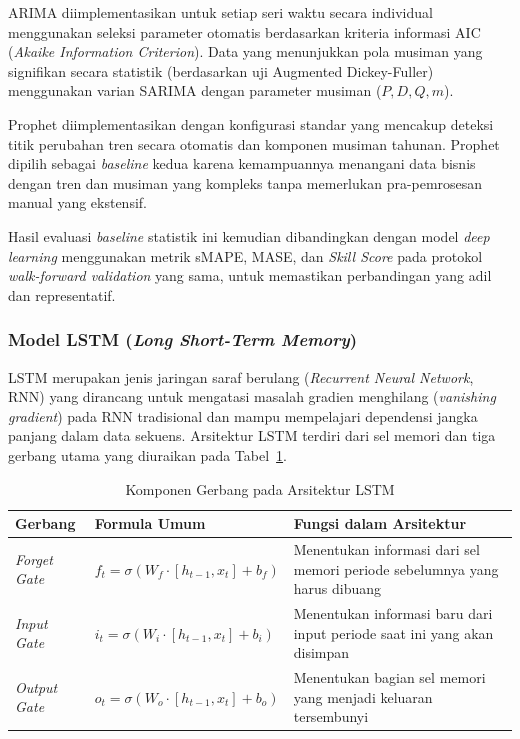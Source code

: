 ARIMA diimplementasikan untuk setiap seri waktu secara individual menggunakan seleksi parameter otomatis berdasarkan kriteria informasi AIC (\textit{Akaike Information Criterion}). Data yang menunjukkan pola musiman yang signifikan secara statistik (berdasarkan uji Augmented Dickey-Fuller) menggunakan varian SARIMA dengan parameter musiman (\(P, D, Q, m\)).

Prophet diimplementasikan dengan konfigurasi standar yang mencakup deteksi titik perubahan tren secara otomatis dan komponen musiman tahunan. Prophet dipilih sebagai \textit{baseline} kedua karena kemampuannya menangani data bisnis dengan tren dan musiman yang kompleks tanpa memerlukan pra-pemrosesan manual yang ekstensif.

Hasil evaluasi \textit{baseline} statistik ini kemudian dibandingkan dengan model \textit{deep learning} menggunakan metrik sMAPE, MASE, dan \textit{Skill Score} pada protokol \textit{walk-forward validation} yang sama, untuk memastikan perbandingan yang adil dan representatif.

\subsubsection{Model LSTM (\textit{Long Short-Term Memory})}

LSTM merupakan jenis jaringan saraf berulang (\textit{Recurrent Neural Network}, RNN) yang dirancang untuk mengatasi masalah gradien menghilang (\textit{vanishing gradient}) pada RNN tradisional dan mampu mempelajari dependensi jangka panjang dalam data sekuens. Arsitektur LSTM terdiri dari sel memori dan tiga gerbang utama yang diuraikan pada Tabel~\ref{tab:lstm-gates}.

\begin{table}[htbp]
\centering
\caption{Komponen Gerbang pada Arsitektur LSTM}
\label{tab:lstm-gates}
\begin{tabular}{|p{2.5cm}|p{3.5cm}|p{6.5cm}|}
\hline
\textbf{Gerbang} & \textbf{Formula Umum} & \textbf{Fungsi dalam Arsitektur} \\
\hline
\textit{Forget Gate} & $f_t = \sigma(W_f \cdot [h_{t-1}, x_t] + b_f)$ & Menentukan informasi dari sel memori periode sebelumnya yang harus dibuang \\
\hline
\textit{Input Gate} & $i_t = \sigma(W_i \cdot [h_{t-1}, x_t] + b_i)$ & Menentukan informasi baru dari input periode saat ini yang akan disimpan \\
\hline
\textit{Output Gate} & $o_t = \sigma(W_o \cdot [h_{t-1}, x_t] + b_o)$ & Menentukan bagian sel memori yang menjadi keluaran tersembunyi \\
\hline
\end{tabular}
\end{table}

